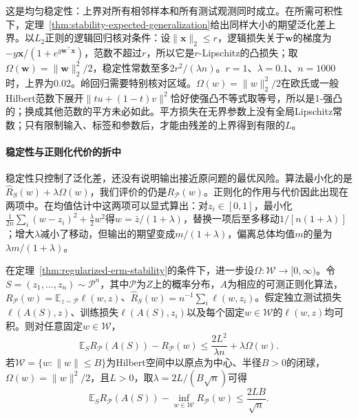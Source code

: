 这是均匀稳定性：上界对所有相邻样本和所有测试观测同时成立。在所需可积性下，定理~\ref{thm:stability-expected-generalization}给出同样大小的期望泛化差上界。以$L_2$正则的逻辑回归核对条件：设$\|\bm x\|_2\leq r$，逻辑损失关于$\bm w$的梯度为$-y\bm x/(1+e^{y\bm w^\top\bm x})$，范数不超过$r$，所以它是$r$-Lipschitz的凸损失；取$\Omega(\bm w)=\|\bm w\|_2^2/2$，稳定性常数至多$2r^2/(\lambda n)$。$r=1$、$\lambda=0.1$、$n=1000$时，上界为0.02。岭回归需要特别核对区域。$\Omega(w)=\|w\|_2^2/2$在欧氏或一般Hilbert范数下展开$\|tu+(1-t)v\|^2$恰好使强凸不等式取等号，所以是1-强凸的；换成其他范数的平方未必如此。平方损失在无界参数上没有全局Lipschitz常数；只有限制输入、标签和参数后，才能由残差的上界得到有限的$L$。

\paragraph{稳定性与正则化代价的折中}

稳定性只控制了泛化差，还没有说明输出接近原问题的最优风险。算法最小化的是$\hat R_S(w)+\lambda\Omega(w)$，我们评价的仍是$R_{\mathcal P}(w)$。正则化的作用与代价因此出现在两项中。在均值估计中这两项可以显式算出：对$z_i\in[0,1]$，最小化$\frac1{2n}\sum_i(w-z_i)^2+\frac\lambda2w^2$得$\hat w=\bar z/(1+\lambda)$，替换一项后至多移动$1/[n(1+\lambda)]$；增大$\lambda$减小了移动，但输出的期望变成$m/(1+\lambda)$，偏离总体均值$m$的量为$\lambda m/(1+\lambda)$。

\begin{theorem}[正则化学习的期望风险保证]
\label{thm:regularized-learning-risk}
在定理~\ref{thm:regularized-erm-stability}的条件下，进一步设$\Omega:\mathcal W\to[0,\infty)$。令$S=(z_1,\ldots,z_n)\sim\mathcal P^n$，其中$\mathcal P$为$Z$上的概率分布，$A$为相应的可测正则化算法，$R_{\mathcal P}(w)=\mathbb E_{z\sim\mathcal P}\ell(w,z)$、$\hat R_S(w)=n^{-1}\sum_i\ell(w,z_i)$。假定独立测试损失$\ell(A(S),z)$、训练损失$\ell(A(S),z_i)$以及每个固定$w\in\mathcal W$的$\ell(w,z)$均可积。则对任意固定$w\in\mathcal W$，
\begin{equation}
 \mathbb E_S R_{\mathcal P}(A(S))-R_{\mathcal P}(w)
 \leq\frac{2L^2}{\lambda n}+\lambda\Omega(w).
 \label{eq:regularization-excess-risk}
\end{equation}
若$\mathcal W=\{w:\|w\|\leq B\}$为Hilbert空间中以原点为中心、半径$B>0$的闭球，$\Omega(w)=\|w\|^2/2$，且$L>0$，取$\lambda=2L/(B\sqrt n)$可得
\[
 \mathbb E_S R_{\mathcal P}(A(S))-\inf_{w\in\mathcal W}R_{\mathcal P}(w)
 \leq\frac{2LB}{\sqrt n}.
\]
\end{theorem}

